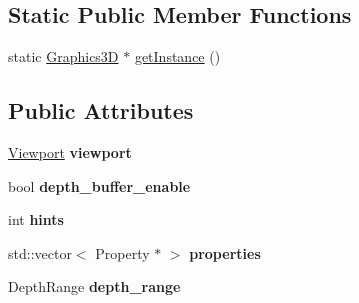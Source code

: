 \subsection*{Static Public Member Functions}
\begin{CompactItemize}
\item 
static \hyperlink{classm3g_1_1Graphics3D}{Graphics3D} $\ast$ \hyperlink{classm3g_1_1Graphics3D_da6d71754bfe755dd8204a9332e9ed47}{getInstance} ()
\end{CompactItemize}
\subsection*{Public Attributes}
\begin{CompactItemize}
\item 
\hypertarget{classm3g_1_1Graphics3D_6a0b80dfc7341ce8102a7cb1688aff0a}{
\hyperlink{structm3g_1_1Graphics3D_1_1Viewport}{Viewport} \textbf{viewport}}
\label{classm3g_1_1Graphics3D_6a0b80dfc7341ce8102a7cb1688aff0a}

\item 
\hypertarget{classm3g_1_1Graphics3D_12e48d234a9d97ae438019a4c44b989c}{
bool \textbf{depth\_\-buffer\_\-enable}}
\label{classm3g_1_1Graphics3D_12e48d234a9d97ae438019a4c44b989c}

\item 
\hypertarget{classm3g_1_1Graphics3D_b557fee5e49a2c2bcdf8803d25b464fb}{
int \textbf{hints}}
\label{classm3g_1_1Graphics3D_b557fee5e49a2c2bcdf8803d25b464fb}

\item 
\hypertarget{classm3g_1_1Graphics3D_c4e9c4de7572c6bdf18ecbba4ff8f97c}{
std::vector$<$ Property $\ast$ $>$ \textbf{properties}}
\label{classm3g_1_1Graphics3D_c4e9c4de7572c6bdf18ecbba4ff8f97c}

\item 
\hypertarget{classm3g_1_1Graphics3D_ac5360336501ffd544f72821c2f3fd3e}{
DepthRange \textbf{depth\_\-range}}
\label{classm3g_1_1Graphics3D_ac5360336501ffd544f72821c2f3fd3e}

\end{CompactItemize}
